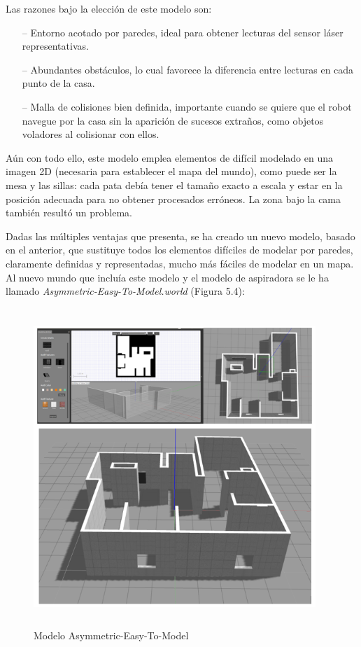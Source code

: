 Las razones bajo la elección de este modelo son:

\begin{itemize}
	\item[--] Entorno acotado por paredes, ideal para obtener lecturas del sensor láser representativas.
	\item[--]	Abundantes obstáculos, lo cual favorece la diferencia entre lecturas en cada punto de la casa.
	\item[--]	Malla de colisiones bien definida, importante cuando se quiere que el robot navegue por la casa sin la aparición de sucesos extraños, como objetos voladores al colisionar con ellos. 
\end{itemize}

Aún con todo ello, este modelo emplea elementos de difícil modelado en una imagen 2D (necesaria para establecer el mapa del mundo), como puede ser la mesa y las sillas: cada pata debía tener el tamaño exacto a escala y estar en la posición adecuada para no obtener procesados erróneos. La zona bajo la cama también resultó un problema. 

Dadas las múltiples ventajas que presenta, se ha creado un nuevo modelo, basado en el anterior, que sustituye todos los elementos difíciles de modelar por paredes, claramente definidas y representadas, mucho más fáciles de modelar en un mapa. Al nuevo mundo que incluía este modelo y el modelo de aspiradora se le ha llamado \textit{Asymmetric-Easy-To-Model.world} (Figura 5.4):

\begin{figure}[H]
  \begin{center}
    \includegraphics[width=0.95\textwidth, height=12cm]{figures/modeloasymmetric.png}
		\caption{Modelo Asymmetric-Easy-To-Model}
		\label{fig.modeloasymmetric}
		\end{center}
\end{figure} 

